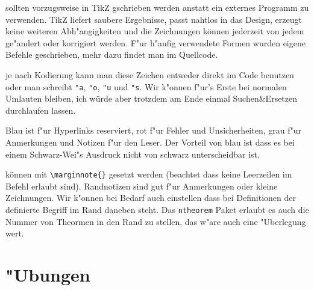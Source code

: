 \documentclass[paper=A4, twoside, chapterprefix=true, bibliography=totoc, headsepline]{scrbook}
\renewcommand{\thesection}{\arabic{section}}
\renewcommand*{\sectionmarkformat}{\thesection\autodot\enskip}
\begin{document}
\begin{description}[font=\normalfont\itshape]
\item[Zeichungen:]
	sollten vorzugsweise in TikZ gschrieben werden anstatt ein externes Programm zu verwenden. TikZ liefert saubere Ergebnisse, passt nahtlos in das Design, erzeugt keine weiteren Abh"angigkeiten und die Zeichnungen können jederzeit von jedem ge"andert oder korrigiert werden. F"ur h"aufig verwendete Formen wurden eigene Befehle geschrieben, mehr dazu findet man im Quellcode.
\item[Umlaute und "s:]
	je nach Kodierung kann man diese Zeichen entweder direkt im Code benutzen oder man schreibt \verb|"a|, \verb|"o|, \verb|"u| und \verb|"s|. Wir k"onnen f"ur's Erste bei normalen Umlauten bleiben, ich würde aber trotzdem am Ende einmal Suchen\&Ersetzen durchlaufen lassen.
\item[Farben:]
	Blau ist f"ur Hyperlinks reserviert, rot f"ur Fehler und Unsicherheiten, grau f"ur Anmerkungen und Notizen f"ur den Leser. Der Vorteil von blau ist dass es bei einem Schwarz-Wei"s Ausdruck nicht von schwarz unterscheidbar ist.
\item[Randnotizen:]
	können mit \verb|\marginnote{}| gesetzt werden (beachtet dass keine Leerzeilen im Befehl erlaubt sind). Randnotizen sind gut f"ur Anmerkungen oder kleine Zeichnungen. Wir k"onnen bei Bedarf auch einstellen dass bei Definitionen der definierte Begriff im Rand daneben steht. Das \verb|ntheorem| Paket erlaubt es auch die Nummer von Theormen in den Rand zu stellen, das w"are auch eine "Uberlegung wert.
\end{description}










\appendix


\chapter{"Ubungen}

\renewcommand*{\othersectionlevelsformat}[3]{\ifstr{#1}{section}{\"Ubung\ #3\ vom\ }{#3\autodot\enskip}}

\renewcommand*{\sectionmarkformat}{\"Ubung \thesection\autodot\ vom\enskip}
\end{document}
